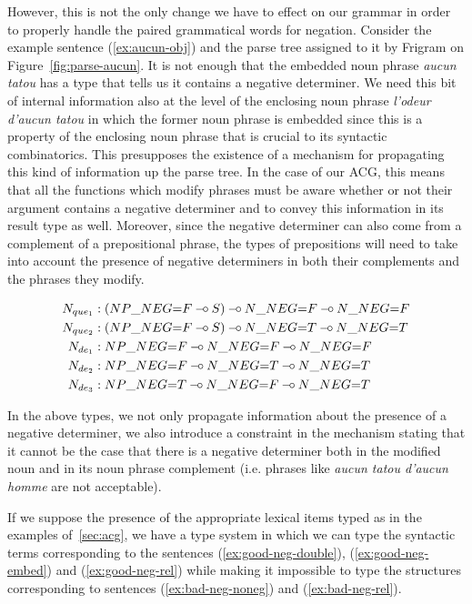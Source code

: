 However, this is not the only change we have to effect on our grammar in
order to properly handle the paired grammatical words for
negation. Consider the example sentence (\ref{ex:aucun-obj}) and the
parse tree assigned to it by Frigram on Figure~\ref{fig:parse-aucun}. It
is not enough that the embedded noun phrase \emph{aucun tatou} has a
type that tells us it contains a negative determiner. We need this bit
of internal information also at the level of the enclosing noun phrase
\emph{l'odeur d'aucun tatou} in which the former noun phrase is embedded
since this is a property of the enclosing noun phrase that is crucial to
its syntactic combinatorics. This presupposes the existence of a
mechanism for propagating this kind of information up the parse tree. In
the case of our ACG, this means that all the functions which modify
phrases must be aware whether or not their argument contains a negative
determiner and to convey this information in its result type as
well. Moreover, since the negative determiner can also come from a
complement of a prepositional phrase, the types of prepositions will
need to take into account the presence of negative determiners in both
their complements and the phrases they modify.

\begin{align*}
N_{que_1} &: (NP\_NEG{=}F \limp S) \limp N\_NEG{=}F \limp N\_NEG{=}F \\
N_{que_2} &: (NP\_NEG{=}F \limp S) \limp N\_NEG{=}T \limp N\_NEG{=}T \\
N_{de_1} &: NP\_NEG{=}F \limp N\_NEG{=}F \limp N\_NEG{=}F \\
N_{de_2} &: NP\_NEG{=}F \limp N\_NEG{=}T \limp N\_NEG{=}T \\
N_{de_3} &: NP\_NEG{=}T \limp N\_NEG{=}F \limp N\_NEG{=}T
\end{align*}

In the above types, we not only propagate information about the presence
of a negative determiner, we also introduce a constraint in the
mechanism stating that it cannot be the case that there is a negative
determiner both in the modified noun and in its noun phrase complement
(i.e. phrases like \emph{aucun tatou d'aucun homme} are not acceptable).

If we suppose the presence of the appropriate lexical items typed as in
the examples of~\ref{sec:acg}, we have a type system in which we can
type the syntactic terms corresponding to the sentences
(\ref{ex:good-neg-double}), (\ref{ex:good-neg-embed}) and
(\ref{ex:good-neg-rel}) while making it impossible to type the
structures corresponding to sentences (\ref{ex:bad-neg-noneg}) and
({\ref{ex:bad-neg-rel}}).

